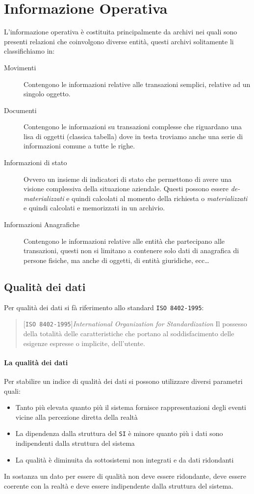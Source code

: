 \section{Informazione Operativa}
    L'informazione operativa è costituita principalmente da archivi nei quali sono presenti relazioni che coinvolgono diverse entità, questi archivi solitamente li classifichiamo in:
    \begin{description}
        \item[Movimenti] Contengono le informazioni relative alle transazioni semplici, relative ad un singolo oggetto.
        \item[Documenti] Contengono le informazioni su transazioni complesse che riguardano una lisa di oggetti (classica tabella) dove in testa troviamo anche una serie di informazioni comune a tutte le righe.
        \item[Informazioni di stato] Ovvero un insieme di indicatori di stato che permettono di avere una visione complessiva della situazione aziendale. Questi possono essere \textit{de-materializzati} e quindi calcolati al momento della richiesta o \textit{materializzati} e quindi calcolati e memorizzati in un archivio.
        \item[Informazioni Anagrafiche] Contengono le informazioni relative alle entità che partecipano alle transazioni, questi non si limitano a contenere solo dati di anagrafica di persone fisiche, ma anche di oggetti, di entità giuridiche, ecc\dots
    \end{description}
    \subsection{Qualità dei dati}
        Per qualità dei dati si fà riferimento allo standard \texttt{ISO 8402-1995}:
        \begin{quote}[\texttt{ISO 8402-1995}]{\textit{International Organization for Standardization}}
            Il possesso della totalità delle caratteristiche che portano al soddisfacimento delle esigenze espresse o implicite, dell'utente.
        \end{quote}
        \paragraph{La qualità dei dati}
            Per stabilire un indice di qualità dei dati si possono utilizzare diversi parametri quali:
            \begin{itemize}
                \item Tanto più elevata quanto più il sistema fornisce rappresentazioni degli eventi vicine alla percezione diretta della realtà
                \item La dipendenza dalla struttura del \texttt{SI} è minore quanto più i dati sono indipendenti dalla struttura del sistema
                \item La qualità è diminuita da sottosistemi non integrati e da dati ridondanti
            \end{itemize}
            In sostanza un dato per essere di qualità non deve essere ridondante, deve essere coerente con la realtà e deve essere indipendente dalla struttura del sistema.
